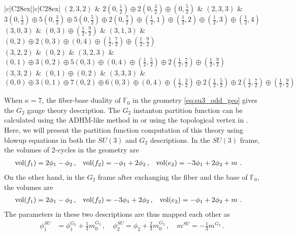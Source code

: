 \begin{table}
\begin{tabular}{|c|C{28ex}||c|C{28ex}|}
		$ (2, 3, 2) $ & $ 2(0,\frac{1}{2}) \oplus 2(0,\frac{3}{2}) \oplus (0,\frac{5}{2}) $ & $ (2, 3, 3) $ & $ 3(0,\frac{1}{2}) \oplus 5(0,\frac{3}{2}) \oplus 5(0,\frac{5}{2}) \oplus 2(0,\frac{7}{2}) \oplus (\frac{1}{2},1) \oplus (\frac{1}{2},2) \oplus (\frac{1}{2},3) \oplus (\frac{1}{2},4) $ \\ \hline
		$ (3, 0, 3) $ & $ (0,3) \oplus (\frac{1}{2},\frac{9}{2}) $ & $ (3, 1, 3) $ & $ (0,2) \oplus 2(0,3) \oplus (0,4) \oplus (\frac{1}{2},\frac{7}{2}) \oplus (\frac{1}{2},\frac{9}{2}) $ \\ \hline
		$ (3, 2, 2) $ & $ (0, 2) $ & $ (3, 2, 3) $ & $ (0,1) \oplus 3(0,2) \oplus 5(0,3) \oplus (0,4) \oplus (\frac{1}{2},\frac{5}{2}) \oplus 2(\frac{1}{2},\frac{7}{2}) \oplus (\frac{1}{2},\frac{9}{2}) $ \\ \hline
		$ (3, 3, 2) $ & $ (0, 1) \oplus (0, 2) $ & $ (3, 3, 3) $ & $ (0,0) \oplus 3(0,1) \oplus 7(0,2) \oplus 6(0,3) \oplus (0,4) \oplus (\frac{1}{2},\frac{3}{2}) \oplus 2(\frac{1}{2},\frac{5}{2}) \oplus 2(\frac{1}{2},\frac{7}{2}) \oplus (\frac{1}{2},\frac{9}{2}) $ \\ \hline
	\end{tabular}
	\caption{BPS spectrum of the $SU(3)_6$ theory for $d_i \leq 3$. Here, $ \mathbf{d} = (d_1, d_2, d_3) $ labels the BPS states with charge $d_1 e_2 + d_2 f_1 + d_3 f_2$.} \label{table:SU3_6}
\end{table}

When $ \kappa = 7 $, the fiber-base duality of $ \mathbb{F}_0 $ in the geometry \eqref{eq:su3_odd_geo}  gives the $ G_2 $ gauge theory description. The $ G_2 $ instanton partition function can be calculated using the ADHM-like method in \cite{Kim:2018gjo} or using the topological vertex in \cite{Hayashi:2018bkd}. Here, we will present the partition function computation of this theory using blowup equations in both the $SU(3)$ and $G_2$ descriptions. In the $ SU(3) $ frame, the volumes of 2-cycles in the geometry are
\begin{align}
\operatorname{vol}(f_1) &= 2\phi_1 - \phi_2\,, &
\operatorname{vol}(f_2) &= -\phi_1 + 2\phi_2\,, &
\operatorname{vol}(e_2) &= -3\phi_1 + 2\phi_2 + m \ .
\end{align}
On the other hand, in the $ G_2 $ frame after exchanging the fiber and the base of $ \mathbb{F}_0 $, the volumes are 
\begin{align}
\operatorname{vol} (f_1) &= 2\phi_1 - \phi_2\,,&
\operatorname{vol} (f_2) &= -3\phi_1 + 2\phi_2 \,,&
\operatorname{vol} (e_2) &= -\phi_1 + 2\phi_2 + m \ .
\end{align}
The parameters in these two descriptions are thus mapped each other as \cite{Hayashi:2018lyv}
\begin{align}
\phi_1^{SU} &= \phi_1^{G_2} + \frac{1}{3} m_0^{G_2}\,, \quad
\phi_2^{SU} = \phi_2 + \frac{2}{3} m_0^{G_2}\,, \quad
m^{SU} = -\frac{1}{3} m^{G_2}\, .
\end{align}

